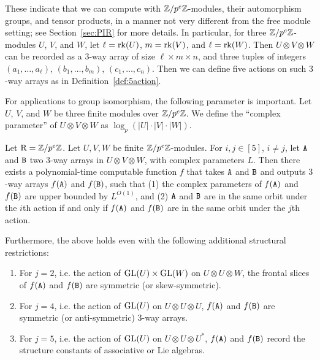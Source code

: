 These indicate that we can compute with $\mathbb{Z}/p^e\mathbb{Z}$-modules, their automorphism groups, and tensor products, in a manner not very different from the free module setting; see Section~\ref{sec:PIR} for more details. In particular, for three $\mathbb{Z}/p^e\mathbb{Z}$-modules $U$, $V$, and $W$, let $\ell=\mathrm{rk}(U)$, $m=\mathrm{rk}(V)$, and $\ell=\mathrm{rk}(W)$. Then $U\otimes V\otimes W$ can be recorded as a $3$-way array of size $\ell\times m\times n$, and three tuples of integers $(a_1, \dots, a_\ell)$, $(b_1, \dots, b_m)$, $(c_1, \dots, c_n)$. Then we can define five actions on such $3$-way arrays as in Definition~\ref{def:5action}.

For applications to group isomorphism, the following parameter is important. Let $U$, $V$, and $W$ be three finite modules over $\mathbb{Z}/p^e\mathbb{Z}$. We define the ``complex parameter'' of $U\otimes V\otimes W$ as $\log_p(|U|\cdot |V|\cdot |W|)$.
\begin{theorem}\label{thm:ptoe-equivalence}
	Let $\mathrm{R}=\mathbb{Z}/p^e\mathbb{Z}$. Let $U, V, W$ be finite $\mathbb{Z}/p^e\mathbb{Z}$-modules. %
	For $i, j\in[5]$, $i\neq j$, let $\mathtt{A}$ and $\mathtt{B}$ two $3$-way arrays in $U \otimes V \otimes W$, %
	with complex parameters $L$. Then there exists a polynomial-time computable function $f$ that takes $\mathtt{A}$ and $\mathtt{B}$ and outputs $3$-way arrays $f(\mathtt{A})$ and $f(\mathtt{B})$, such that (1) the complex parameters of $f(\mathtt{A})$ and $f(\mathtt{B})$ are upper bounded by $L^{O(1)}$,
	and (2) $\mathtt{A}$ and $\mathtt{B}$ are in the same orbit under the $i$th action if and only if $f(\mathtt{A})$ and $f(\mathtt{B})$ are in the same orbit under the $j$th action.
	
	Furthermore, the above holds even with the following additional structural restrictions:
	\begin{enumerate}
		\item For $j=2$, i.e. the action of $\mathrm{GL}(U)\times \mathrm{GL}(W)$ on $U\otimes U\otimes W$, the frontal slices of $f(\mathtt{A})$ and $f(\mathtt{B})$ are symmetric (or skew-symmetric). 
		\item For $j=4$, i.e. the action of $\mathrm{GL}(U)$ on $U\otimes U\otimes U$, $f(\mathtt{A})$ and $f(\mathtt{B})$ are symmetric (or anti-symmetric) $3$-way arrays. 
		\item For $j=5$, i.e. the action of $\mathrm{GL}(U)$ on $U\otimes U\otimes U^*$, $f(\mathtt{A})$ and $f(\mathtt{B})$ record the structure constants of associative or Lie algebras. 
	\end{enumerate}
\end{theorem}

